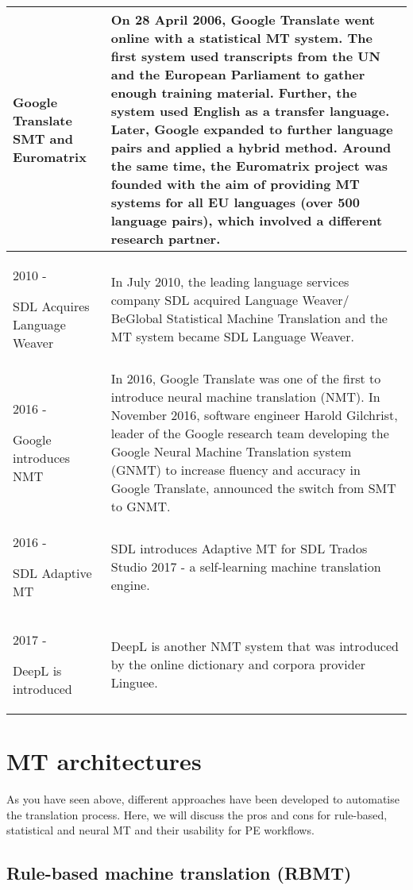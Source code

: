 \begin{longtable}[c]{ |>{\raggedright}p{2.8cm}||p{8.5cm}|  }
 Google Translate SMT and Euromatrix & On 28 April 2006, Google Translate went online with a statistical MT system. The first system used transcripts from the UN and the European Parliament to gather enough training material. Further, the system used English as a transfer language. Later, Google expanded to further language pairs and applied a hybrid method. Around the same time, the Euromatrix project was founded with the aim of providing MT systems for all EU languages (over 500 language pairs), which involved a different research partner.\\ \hline
 2010 - 
 
 SDL Acquires Language Weaver & In July 2010, the leading language services company SDL acquired Language Weaver/ BeGlobal Statistical Machine Translation and the MT system became SDL Language Weaver.\\ \hline
 2016 - 
 
 Google introduces NMT & In 2016, Google Translate was one of the first to introduce neural machine translation (NMT). In November 2016, software engineer Harold Gilchrist, leader of the Google research team developing the Google Neural Machine Translation system (GNMT) to increase fluency and accuracy in Google Translate, announced the switch from SMT to GNMT.\\ \hline
 2016 - 
 
 SDL Adaptive MT & SDL introduces Adaptive MT for SDL Trados Studio 2017 - a self-learning machine translation engine.\\ \hline
 2017 - 
 
 DeepL is introduced & DeepL is another NMT system that was introduced by the online dictionary and corpora provider Linguee.\\ 
\end{longtable}




\section{MT architectures}\label{sec:3:2}

As you have seen above, different approaches have been developed to automatise the translation process. Here, we will discuss the pros and cons for rule-based, statistical and neural MT and their usability for PE workflows. 

\subsection{Rule-based machine translation (RBMT)}\label{sec:3:2:1}

